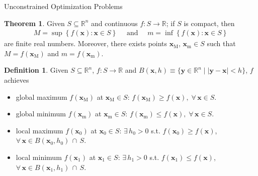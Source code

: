 \documentclass[10pt,handout]{beamer}
\newcommand{\ds}{\displaystyle}
\theoremstyle{definition}
\newtheorem*{dfn}{Definition}
\newtheorem*{thm}{Theorem}
\newcommand{\vx}{\mathbf{x}}
\newcommand{\vy}{\mathbf{y}}
\begin{document}
\begin{frame}{Unconstrained Optimization Problems}
  \begin{thm}%
    Given $\ds S\subseteq\mathbb{R}^n$ and continuous $f: S\to\mathbb{R}$; if $S$ is compact, then  
    \begin{align*}
      M = \sup\left\{f(\vx): \vx\in S\right\}\quad\text{ and }\quad m = \inf\left\{f(\vx): \vx\in S\right\}
    \end{align*}
    are finite real numbers. Moreover, there exists points $\vx_\text{M}$, $\vx_\text{m}\in S$ such that $M = f(\vx_\text{M})$ and $m = f(\vx_\text{m})$.
  \end{thm}

  \begin{dfn}
    Given $\ds S\subseteq\mathbb{R}^n$, $\ds f:S\to\mathbb{R}$ and $\ds B(\vx, h)\equiv\{\vy\in\mathbb{R}^n\;|\;|\vy - \vx| < h\}$, $f$ achieves 
    \begin{itemize}
      \item global maximum $\ds f(\vx_\text{M})$ at $\ds\vx_\text{M}\in S$: $\ds f(\vx_\text{M})\geqslant f(\vx),\;\forall\,\vx\in S$. 
      \item global minimum $\ds f(\vx_\text{m})$ at $\ds \vx_\text{m}\in S$: $\ds f(\vx_\text{m})\leqslant f(\vx),\;\forall\,\vx\in S$. 
      \item local maximum $\ds f(\vx_0)$ at $\ds\vx_0\in S$: $\ds\exists\,h_0 > 0$ s.t. $\ds f(\vx_0)\geqslant f(\vx)$, $\ds\forall\,\vx\in B(\vx_0, h_0)\,\cap\,S$. 
      \item local minimum $\ds f(\vx_1)$ at $\ds\vx_1\in S$: $\ds\exists\,h_1 > 0$ s.t. $\ds f(\vx_1)\leqslant f(\vx)$, $\ds\forall\,\vx\in B(\vx_1, h_1)\,\cap\,S$. 
    \end{itemize}
  \end{dfn}
\end{frame}
\end{document}
